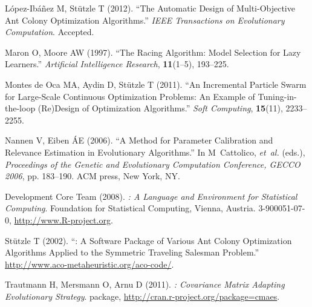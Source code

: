 \documentclass[article,a4paper,nojss,notitle]{jss}
\newcommand{\SoftwarePackage}{\pkg}
\begin{document}
\begin{thebibliography}{34}
L{\'o}pez-Ib{\'a}{\~n}ez M, St{\"u}tzle T (2012).
\newblock \enquote{The Automatic Design of Multi-Objective Ant Colony
  Optimization Algorithms.}
\newblock \emph{IEEE Transactions on Evolutionary Computation}.
\newblock Accepted.

Maron O, Moore AW (1997).
\newblock \enquote{The Racing Algorithm: {M}odel Selection for Lazy Learners.}
\newblock \emph{Artificial Intelligence Research}, \textbf{11}(1--5), 193--225.

{Montes de Oca} MA, Aydin D, St{\"u}tzle T (2011).
\newblock \enquote{An Incremental Particle Swarm for Large-Scale Continuous
  Optimization Problems: An Example of Tuning-in-the-loop (Re)Design of
  Optimization Algorithms.}
\newblock \emph{Soft Computing}, \textbf{15}(11), 2233--2255.

Nannen V, Eiben {\'A}E (2006).
\newblock \enquote{A Method for Parameter Calibration and Relevance Estimation
  in Evolutionary Algorithms.}
\newblock In M~Cattolico, \emph{et~al.} (eds.), \emph{Proceedings of the
  Genetic and Evolutionary Computation Conference, GECCO 2006}, pp. 183--190.
  ACM press, New York, NY.

{ Development Core Team} (2008).
\newblock \emph{: A Language and Environment for Statistical
  Computing}.
\newblock {} Foundation for Statistical Computing, Vienna, Austria.
 3-900051-07-0, 
\urlprefix\url{http://www.R-project.org}.

St{\"u}tzle T (2002).
\newblock \enquote{{\SoftwarePackage{ACOTSP}}: A Software Package of Various
  Ant Colony Optimization Algorithms Applied to the Symmetric Traveling
  Salesman Problem.}
\newblock \urlprefix\url{http://www.aco-metaheuristic.org/aco-code/}.

Trautmann H, Mersmann O, Arnu D (2011).
\newblock \emph{{}: Covariance Matrix Adapting Evolutionary
  Strategy}.
\newblock {} package,
  \urlprefix\url{http://cran.r-project.org/package=cmaes}.

\end{thebibliography}
\end{document}
